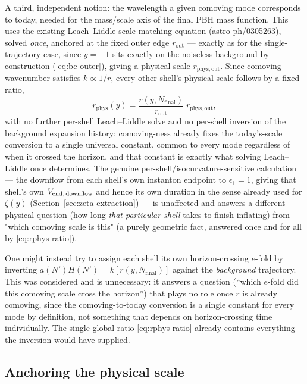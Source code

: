 \documentclass[a4paper,11pt]{article}
\newcommand{\semibold}[1]{{\fontseries{b}\selectfont{#1}}}
\newenvironment{panel}{\begin{tcolorbox}[enhanced,breakable,colback=gray!10,colframe=gray!30]\small}{\end{tcolorbox}}
\newcommand{\Ny}{N}                          %
\newcommand{\Nfinal}{N_{\mathrm{final}}}     %
\newcommand{\epsSR}{\epsilon_1}              %
\newcommand{\Hub}{H}                         %
\newcommand{\rad}{r}                         %
\newcommand{\yco}{y}                         %
\newcommand{\rout}{\rad_{\mathrm{out}}}      %
\newcommand{\rphys}{\rad_{\mathrm{phys}}}    %
\newcommand{\zprofile}{\zeta}                %
\begin{document}
A third, independent notion: the wavelength a given comoving mode
corresponds to today, needed for the mass/scale axis of the final PBH
mass function. This uses the existing Leach--Liddle scale-matching
equation (astro-ph/0305263), solved \emph{once}, anchored at the fixed
outer edge $\rout$ --- exactly as for the single-trajectory case, since
$\yco=-1$ sits exactly on the noiseless background by construction
(\eqref{eq:bc-outer}), giving a physical scale $\rad_{\mathrm{phys,out}}$. Since comoving
wavenumber satisfies $k\propto1/\rad$, every other shell's physical scale
follows by a fixed ratio,
\begin{equation}
    \rphys(\yco) = \frac{\rad(\yco,\Nfinal)}{\rout}\;\rad_{\mathrm{phys,out}} ,
    \label{eq:rphys-ratio}
\end{equation}
with no further per-shell Leach--Liddle solve and no per-shell inversion
of the background expansion history: comoving-ness already fixes the
today's-scale conversion to a single universal constant, common to every
mode regardless of when it crossed the horizon, and that constant is
exactly what solving Leach--Liddle once determines. The genuine
per-shell/isocurvature-sensitive calculation --- the downflow from each
shell's own instanton endpoint to $\epsSR=1$, giving that shell's own
$V_{\rm end,\,downflow}$ and hence its own duration in the sense already
used for $\zprofile(\yco)$ (Section~\ref{sec:zeta-extraction}) --- is
unaffected and answers a different physical question (how long \emph{that
particular shell} takes to finish inflating) from "which comoving scale is
this" (a purely geometric fact, answered once and for all by
\eqref{eq:rphys-ratio}).

\begin{panel}
\semibold{A candidate refinement, considered and rejected.} One might
instead try to assign each shell its own horizon-crossing $e$-fold by
inverting $a(\Ny')\Hub(\Ny')=k[\rad(\yco,\Nfinal)]$ against the
\emph{background} trajectory. This was considered and is unnecessary: it
answers a question (``which $e$-fold did this comoving scale cross the
horizon'') that plays no role once $\rad$ is already comoving, since the
comoving-to-today conversion is a single constant for every mode by
definition, not something that depends on horizon-crossing time
individually. The single global ratio \eqref{eq:rphys-ratio} already
contains everything the inversion would have supplied.
\end{panel}

\subsection{Anchoring the physical scale}
\label{sec:scale-anchor}
\end{document}
